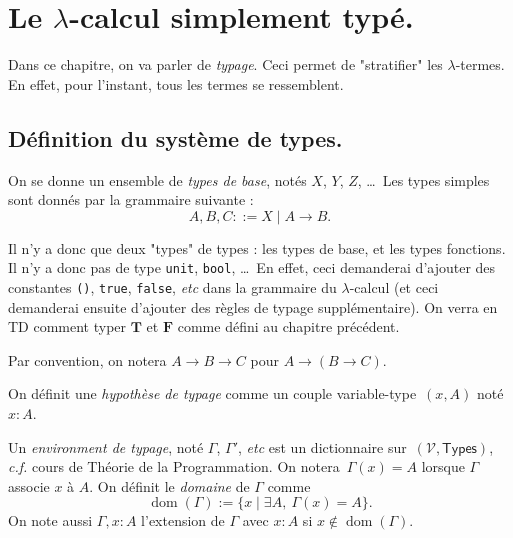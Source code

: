 \documentclass[./main]{subfiles}
\begin{document}
  \chapter{Le $\lambda$-calcul simplement typé.}

  Dans ce chapitre, on va parler de \textit{typage}. Ceci permet de "stratifier" les $\lambda$-termes.
  En effet, pour l'instant, tous les termes se ressemblent.

  \section{Définition du système de types.}

  \begin{defn}
    On se donne un ensemble de \textit{types de base}, notés $X$, $Y$, $Z$, \ldots\
    Les types simples sont donnés par la grammaire suivante :
    \[
    A, B, C ::= X  \mid A \to B
    .\]
  \end{defn}

  Il n'y a donc que deux "types" de types : les types de base, et les types fonctions.
  Il n'y a donc pas de type \lstinline|unit|, \lstinline|bool|, \ldots\ En effet, ceci demanderai d'ajouter des constantes \lstinline|()|, \lstinline|true|, \lstinline|false|, \textit{etc} dans la grammaire du $\lambda$-calcul (et ceci demanderai ensuite d'ajouter des règles de typage supplémentaire). On verra en TD comment typer  $\mathbf{T}$ et $\mathbf{F}$ comme défini au chapitre précédent.

  Par convention, on notera $A \to B \to C$ pour $A \to (B \to C)$.

  \begin{defn}
    On définit une \textit{hypothèse de typage} comme un couple variable-type~$(x, A)$ noté $x: A$.
  \end{defn}

  \begin{defn}
    Un \textit{environment de typage}, noté $\Gamma$, $\Gamma'$,  \textit{etc} est un dictionnaire sur~$(\mathcal{V}, \mathsf{Types})$, \textit{c.f.} cours de Théorie de la Programmation.
    On notera~$\Gamma(x) = A$ lorsque  $\Gamma$ associe  $x$ à $A$. On définit le \textit{domaine} de $\Gamma$ comme \[
      \operatorname{dom}(\Gamma) := \{x  \mid \exists A, \: \Gamma(x) = A\}
    .\]
    On note aussi $\Gamma, x : A$ l'extension de  $\Gamma$ avec $x : A$ si $x\not\in \operatorname{dom}(\Gamma)$.
  \end{defn}
\end{document}
